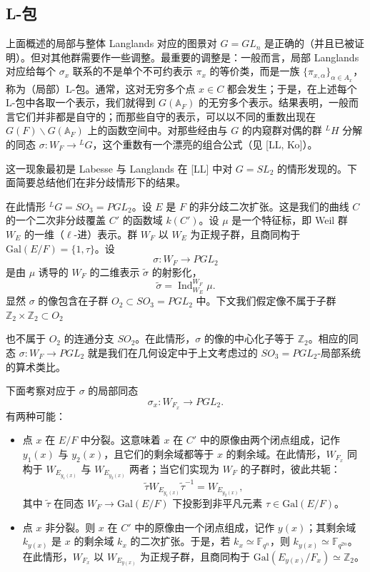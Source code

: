 \documentclass[11pt,a4paper]{article}
\begin{document}
\subsection{L-包}

上面概述的局部与整体 Langlands 对应的图景对 $G=GL_n$ 是正确的（并且已被证明）。但对其他群需要作一些调整。最重要的调整是：一般而言，局部 Langlands 对应给每个 $\sigma_x$ 联系的不是单个不可约表示 $\pi_x$ 的等价类，而是一族 $\{\pi_{x,\alpha}\}_{\alpha\in A_x}$，称为（局部）L-包。通常，这对无穷多个点 $x\in C$ 都会发生；于是，在上述每个 L-包中各取一个表示，我们就得到 $G(\mathbb{A}_F)$ 的无穷多个表示。结果表明，一般而言它们并非都是自守的；而那些自守的表示，可以以不同的重数出现在 $G(F)\backslash G(\mathbb{A}_F)$ 上的函数空间中。对那些经由与 $G$ 的内窥群对偶的群 ${}^{L}H$ 分解的同态 $\sigma: W_F\to{}^{L}G$，这个重数有一个漂亮的组合公式（见 [LL, Ko]）。

这一现象最初是 Labesse 与 Langlands 在 [LL] 中对 $G=SL_2$ 的情形发现的。下面简要总结他们在非分歧情形下的结果。

在此情形 ${}^{L}G=SO_3=PGL_2$。设 $E$ 是 $F$ 的非分歧二次扩张。这是我们的曲线 $C$ 的一个二次非分歧覆盖 $C'$ 的函数域 $k(C')$。设 $\mu$ 是一个特征标，即 Weil 群 $W_E$ 的一维（$\ell$-进）表示。群 $W_F$ 以 $W_E$ 为正规子群，且商同构于 $\mathrm{Gal}(E/F)=\{1,\tau\}$。设
\[
\sigma: W_F\to PGL_2
\]
是由 $\mu$ 诱导的 $W_F$ 的二维表示 $\tilde\sigma$ 的射影化，
\[
\tilde\sigma = \operatorname{Ind}_{W_E}^{W_F}\mu.
\]
显然 $\sigma$ 的像包含在子群 $O_2\subset SO_3=PGL_2$ 中。下文我们假定像不属于子群 $\mathbb{Z}_2\times\mathbb{Z}_2\subset O_2$


也不属于 $O_2$ 的连通分支 $SO_2$。在此情形，$\sigma$ 的像的中心化子等于 $\mathbb{Z}_2$。相应的同态 $\sigma: W_F\to PGL_2$ 就是我们在几何设定中于上文考虑过的 $SO_3=PGL_2$-局部系统的算术类比。

下面考察对应于 $\sigma$ 的局部同态
\[
\sigma_x: W_{F_x}\to PGL_2.
\]
有两种可能：
\begin{itemize}[leftmargin=2em,itemsep=2pt,topsep=2pt]
\item 点 $x$ 在 $E/F$ 中分裂。这意味着 $x$ 在 $C'$ 中的原像由两个闭点组成，记作 $y_1(x)$ 与 $y_2(x)$，且它们的剩余域都等于 $x$ 的剩余域。在此情形，$W_{F_x}$ 同构于 $W_{E_{y_1(x)}}$ 与 $W_{E_{y_2(x)}}$ 两者；当它们实现为 $W_F$ 的子群时，彼此共轭：
\[
\tilde\tau W_{E_{y_1(x)}}\tilde\tau^{-1} = W_{E_{y_2(x)}},
\]
其中 $\tilde\tau$ 在同态 $W_F\to\mathrm{Gal}(E/F)$ 下投影到非平凡元素 $\tau\in\mathrm{Gal}(E/F)$。
\item 点 $x$ 非分裂。则 $x$ 在 $C'$ 中的原像由一个闭点组成，记作 $y(x)$；其剩余域 $k_{y(x)}$ 是 $x$ 的剩余域 $k_x$ 的二次扩张。于是，若 $k_x\simeq\mathbb{F}_{q^n}$，则 $k_{y(x)}\simeq\mathbb{F}_{q^{2n}}$。在此情形，$W_{F_x}$ 以 $W_{E_{y(x)}}$ 为正规子群，且商同构于 $\mathrm{Gal}(E_{y(x)}/F_x)\simeq\mathbb{Z}_2$。
\end{itemize}
\end{document}
